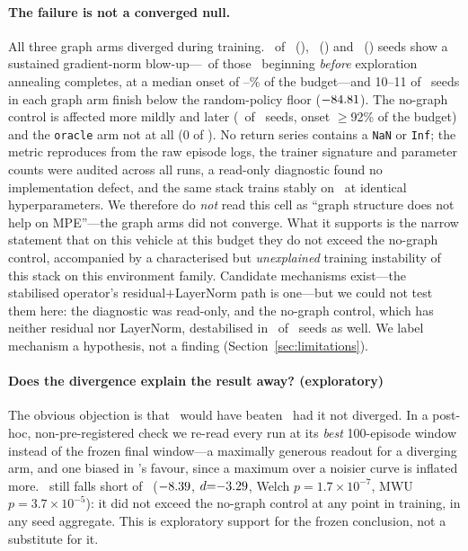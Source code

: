 \paragraph{The failure is not a converged null.} All three graph arms diverged
during training. \PDblowTrue\ of \PDseeds\ (\gtrue), \PDblowWrong\ (\gwrong)
and \PDblowComplete\ (\gcomplete) seeds show a sustained gradient-norm
blow-up---\PDblowEarly\ of those \PDblowTotal\ beginning \emph{before}
exploration annealing completes, at a median onset of
\PDonsetLo--\PDonsetHi\% of the budget---and 10--11 of \PDseeds\ seeds in each
graph arm finish below the random-policy floor ($-84.81$). The no-graph
control is affected more mildly and later (\PDblowMlp\ of \PDseeds\ seeds,
onset $\geq{}$92\% of the budget) and the \texttt{oracle} arm not at all (0 of
\PDseeds). No return series contains a \texttt{NaN} or \texttt{Inf}; the metric
reproduces from the raw episode logs, the trainer signature and parameter
counts were audited across all runs, a read-only diagnostic found no
implementation defect, and the same stack trains stably on \coordgrid\ at
identical hyperparameters. We therefore do \emph{not} read this cell as ``graph
structure does not help on MPE''---the graph arms did not converge. What it
supports is the narrow statement that on this vehicle at this budget they do
not exceed the no-graph control, accompanied by a characterised but
\emph{unexplained} training instability of this stack on this environment
family. Candidate mechanisms exist---the stabilised operator's
residual$+$LayerNorm path is one---but we could not test them here: the
diagnostic was read-only, and the no-graph control, which has neither residual
nor LayerNorm, destabilised in \PDblowMlp\ of \PDseeds\ seeds as well. We label
mechanism a hypothesis, not a finding (Section~\ref{sec:limitations}).

\paragraph{Does the divergence explain the result away? (exploratory)} The
obvious objection is that \gtrue\ would have beaten \mlpc\ had it not diverged.
In a post-hoc, non-pre-registered check we re-read every run at its \emph{best}
100-episode window instead of the frozen final window---a maximally generous
readout for a diverging arm, and one biased in \gtrue's favour, since a maximum
over a noisier curve is inflated more. \gtrue\ still falls short of \mlpc\
($-8.39$, $d{=}{-}3.29$, Welch $p{=}1.7{\times}10^{-7}$, MWU
$p{=}3.7{\times}10^{-5}$): it did not exceed the no-graph control at any point
in training, in any seed aggregate. This is exploratory support for the frozen
conclusion, not a substitute for it.

